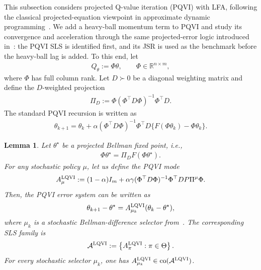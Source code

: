 \documentclass[letterpaper]{article}
\numberwithin{equation}{section}
\newtheorem{lemma}{Lemma}[section]
\newcommand{\R}{\mathbb{R}}
\newcommand{\co}{\operatorname{co}}
\begin{document}
This subsection considers projected Q-value iteration (PQVI) with LFA, following the classical projected-equation viewpoint in approximate dynamic programming~\citep{bertsekas1996neuro,tsitsiklis1997analysis}. We add a heavy-ball momentum term to PQVI and study its convergence and acceleration through the same projected-error logic introduced in~: the PQVI SLS is identified first, and its JSR is used as the benchmark before the heavy-ball lag is added. To this end, let
\begin{align*}
  Q_\theta:=\Phi\theta,
  \qquad
  \Phi\in\R^{n\times m},
\end{align*}
where $\Phi$ has full column rank. Let $D\succ0$ be a diagonal weighting matrix
and define the $D$-weighted projection
\begin{align*}
  \Pi_D:=\Phi(\Phi^\top D\Phi)^{-1}\Phi^\top D.
\end{align*}
The standard PQVI recursion is written as
\begin{align*}
  \theta_{k+1}
  =\theta_k
  +\alpha(\Phi^\top D\Phi)^{-1}\Phi^\top D\{F(\Phi\theta_k)-\Phi\theta_k\}.
\end{align*}
\begin{lemma}
\label{lem:linear-fa-switching-systems}
Let $\theta^\star$ be a projected Bellman fixed point, i.e.,
\begin{align*}
  \Phi\theta^\star=\Pi_D F(\Phi\theta^\star).
\end{align*}
For any stochastic policy $\mu$, let us define the PQVI mode
\begin{align*}
  A_\mu^{\rm LQVI}:=(1-\alpha)I_m
  +\alpha\gamma(\Phi^\top D\Phi)^{-1}\Phi^\top D P\Pi^\mu\Phi.
\end{align*}
Then, the PQVI error system can be written as
\begin{align*}
  \theta_{k+1}-\theta^\star
  =A_{\mu_k}^{\rm LQVI}(\theta_k-\theta^\star),
\end{align*}
where $\mu_k$ is a stochastic Bellman-difference selector from~. The corresponding SLS family is
\begin{align*}
  \mathcal A^{\rm LQVI}:=\left\{A_\pi^{\rm LQVI}:\pi\in\Theta\right\}.
\end{align*}
For every stochastic selector $\mu_k$, one has
$A_{\mu_k}^{\rm LQVI}\in\co(\mathcal A^{\rm LQVI})$.
\end{lemma}
\end{document}
